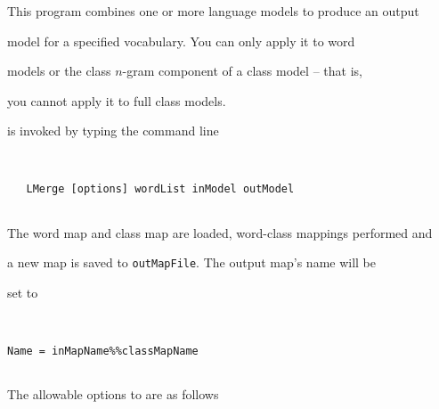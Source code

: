 %




%




%





\newpage














This program combines one or more language models to produce an output 


model for a specified vocabulary.  You can only apply it to word


models or the class $n$-gram component of a class model -- that is,


you cannot apply it to full class models.










 is invoked by typing the command line


\begin{verbatim}


   LMerge [options] wordList inModel outModel


\end{verbatim}


The word map and class map are loaded, word-class mappings performed and 


a new map is saved to \texttt{outMapFile}. The output map's name will be


set to 


\begin{verbatim}


Name = inMapName%%classMapName


\end{verbatim}





The allowable options to  are as follows





